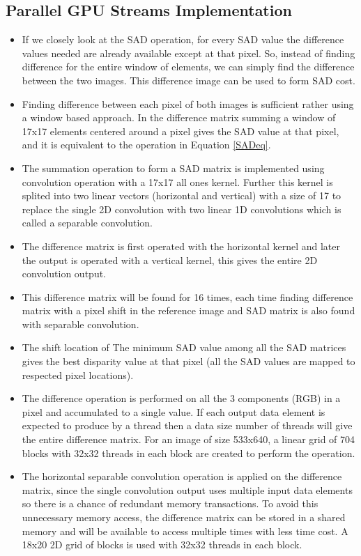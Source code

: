 \subsection{Parallel GPU Streams Implementation}
\begin{itemize}
	\item If we closely look at the SAD operation, for every SAD value the difference values needed are already available except at that pixel. So, instead of finding difference for the entire window of elements, we can simply find the difference between the two images. This difference image can be used to form SAD cost.
	\item Finding difference between each pixel of both images is sufficient rather using a window based approach. In the difference matrix summing a window of 17x17 elements centered around a pixel gives the SAD value at that pixel, and it is equivalent to the operation in Equation \ref{SADeq}.
	\item The summation operation to form a SAD matrix is implemented using convolution operation with a 17x17 all ones kernel. Further this kernel is splited into two linear vectors (horizontal and vertical) with a size of 17 to replace the single 2D convolution with two linear 1D convolutions which is called a separable convolution.
	\item The difference matrix is first operated with the horizontal kernel and later the output is operated with a vertical kernel, this gives the entire 2D convolution output.
	\item This difference matrix will be found for 16 times, each time finding difference matrix with a pixel shift in the reference image and SAD matrix is also found with separable convolution.
	\item The shift location of The minimum SAD value among all the SAD matrices gives the best disparity value at that pixel (all the SAD values are mapped to respected pixel locations).
	\item The difference operation is performed on all the 3 components (RGB) in a pixel and accumulated to a single value. If each output data element is expected to produce by a thread then a data size number of threads will give the entire difference matrix. For an image of size 533x640, a linear grid of 704 blocks with 32x32 threads in each block are created to perform the operation.
	\item The horizontal separable convolution operation is applied on the difference matrix, since the single convolution output uses multiple input data elements so there is a chance of redundant memory transactions. To avoid this unnecessary memory access, the difference matrix can be stored in a shared memory and will be available to access multiple times with less time cost. A 18x20 2D grid of blocks is used with 32x32 threads in each block.

\end{itemize}
